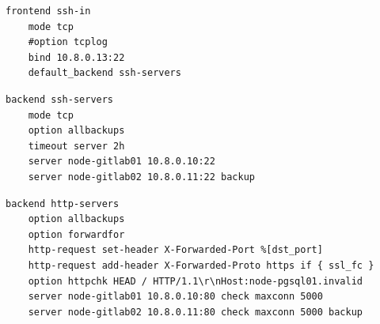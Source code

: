 \documentclass[12pt,a4paper]{article}
\begin{document}
\begin{verbatim}
frontend ssh-in  
    mode tcp
    #option tcplog
    bind 10.8.0.13:22
    default_backend ssh-servers
\end{verbatim}



\begin{verbatim}
backend ssh-servers  
    mode tcp
    option allbackups
    timeout server 2h
    server node-gitlab01 10.8.0.10:22
    server node-gitlab02 10.8.0.11:22 backup

\end{verbatim}

\begin{verbatim}
backend http-servers  
    option allbackups
    option forwardfor
    http-request set-header X-Forwarded-Port %[dst_port]
    http-request add-header X-Forwarded-Proto https if { ssl_fc }
    option httpchk HEAD / HTTP/1.1\r\nHost:node-pgsql01.invalid
    server node-gitlab01 10.8.0.10:80 check maxconn 5000
    server node-gitlab02 10.8.0.11:80 check maxconn 5000 backup

\end{verbatim}
\end{document}
